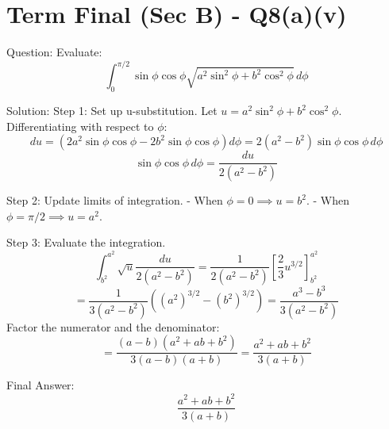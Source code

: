 \documentclass{article}
\begin{document}
\section*{Term Final (Sec B) - Q8(a)(v)}
Question:
Evaluate:
\[
\int_0^{\pi/2} \sin\phi \cos\phi \sqrt{a^2 \sin^2\phi + b^2 \cos^2\phi} \, d\phi
\]

Solution:
Step 1: Set up u-substitution.
Let $u = a^2 \sin^2\phi + b^2 \cos^2\phi$.
Differentiating with respect to $\phi$:
\[
du = \left(2a^2 \sin\phi\cos\phi - 2b^2 \sin\phi\cos\phi\right) d\phi = 2(a^2-b^2)\sin\phi\cos\phi \, d\phi
\]
\[
\sin\phi\cos\phi \, d\phi = \frac{du}{2(a^2-b^2)}
\]

Step 2: Update limits of integration.
- When $\phi = 0 \implies u = b^2$.
- When $\phi = \pi/2 \implies u = a^2$.

Step 3: Evaluate the integration.
\[
\int_{b^2}^{a^2} \sqrt{u} \frac{du}{2(a^2-b^2)} = \frac{1}{2(a^2-b^2)} \left[ \frac{2}{3}u^{3/2} \right]_{b^2}^{a^2}
\]
\[
= \frac{1}{3(a^2-b^2)} \left( (a^2)^{3/2} - (b^2)^{3/2} \right) = \frac{a^3 - b^3}{3(a^2-b^2)}
\]
Factor the numerator and the denominator:
\[
= \frac{(a-b)(a^2+ab+b^2)}{3(a-b)(a+b)} = \frac{a^2+ab+b^2}{3(a+b)}
\]

Final Answer:
\[
\boxed{\frac{a^2+ab+b^2}{3(a+b)}}
\]
\end{document}
